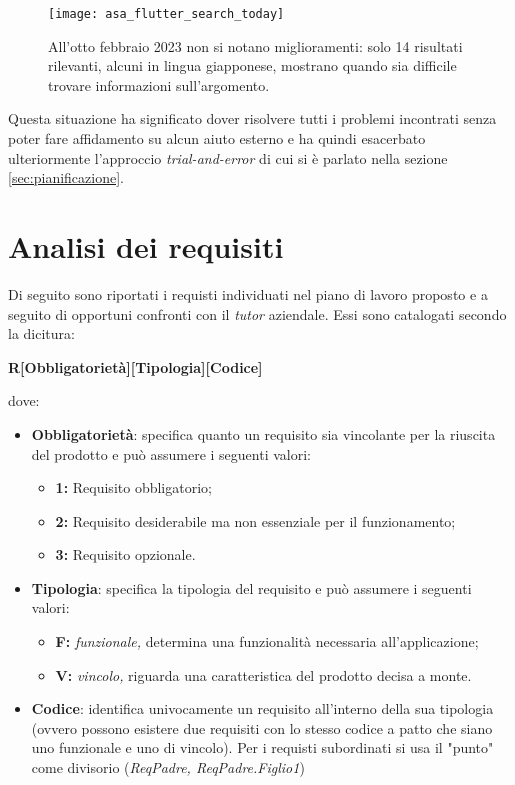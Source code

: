 \begin{figure}[H]
  \centering
  \texttt{[image: asa\_flutter\_search\_today]}
  \caption[Ricerca esatta Flutter e ASA 8 febbraio]{All'otto febbraio 2023 non si notano miglioramenti: solo 14 risultati rilevanti, alcuni in lingua giapponese, mostrano quando sia difficile trovare informazioni sull'argomento.}
  \label{fig:search2}
\end{figure}

Questa situazione ha significato dover risolvere tutti i problemi incontrati senza poter fare affidamento su alcun aiuto esterno e ha quindi esacerbato ulteriormente l'approccio \textit{trial-and-error} di cui si è parlato nella sezione \ref{sec:pianificazione}.


\section{Analisi dei requisiti}
\label{sec:analisi_requisiti}
Di seguito sono riportati i requisti individuati nel piano di lavoro proposto e a seguito di opportuni confronti con il \textit{tutor} aziendale. Essi sono catalogati secondo la dicitura:
\begin{center}
    \textbf{R[Obbligatorietà][Tipologia][Codice]}
\end{center}
dove:
\begin{itemize}
    \item \textbf{Obbligatorietà}: specifica quanto un requisito sia vincolante per la riuscita del prodotto e può assumere i seguenti valori:
    \begin{itemize}
        \item \textbf{1: } Requisito obbligatorio;
        \item \textbf{2: } Requisito desiderabile ma non essenziale per il funzionamento;
        \item \textbf{3: } Requisito opzionale.
    \end{itemize}
    \item \textbf{Tipologia}: specifica la tipologia del requisito e può assumere i seguenti valori:
    \begin{itemize}
        \item \textbf{F: }\textit{funzionale,} determina una funzionalità necessaria all'applicazione;
        \item \textbf{V: }\textit{vincolo,} riguarda una caratteristica del prodotto decisa a monte.
    \end{itemize}
    \item \textbf{Codice}: identifica univocamente un requisito all'interno della sua tipologia (ovvero possono esistere due requisiti con lo stesso codice a patto che siano uno funzionale e uno di vincolo). Per i requisti subordinati si usa il "punto" come divisorio (\textit{ReqPadre, ReqPadre.Figlio1})
\end{itemize}

